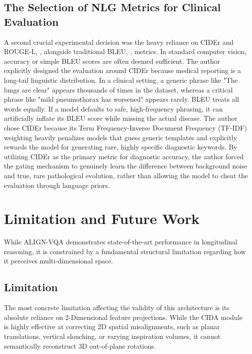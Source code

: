 \subsection{The Selection of NLG Metrics for Clinical Evaluation}
A second crucial experimental decision was the heavy reliance on CIDEr and ROUGE-L, \cite{rouge}, alongside traditional BLEU, \cite{bleu}, metrics. In standard computer vision, accuracy or simple BLEU scores are often deemed sufficient. The author explicitly designed the evaluation around CIDEr because medical reporting is a long-tail linguistic distribution. In a clinical setting, a generic phrase like "The lungs are clear" appears thousands of times in the dataset, whereas a critical phrase like "mild pneumothorax has worsened" appears rarely. BLEU treats all words equally. If a model defaults to safe, high-frequency phrasing, it can artificially inflate its BLEU score while missing the actual disease. The author chose CIDEr because its Term Frequency-Inverse Document Frequency (TF-IDF) weighting heavily penalizes models that guess generic templates and explicitly rewards the model for generating rare, highly specific diagnostic keywords. By utilizing CIDEr as the primary metric for diagnostic accuracy, the author forced the gating mechanism to genuinely learn the difference between background noise and true, rare pathological evolution, rather than allowing the model to cheat the evaluation through language priors.

\section{Limitation and Future Work}
While ALIGN-VQA demonstrates state-of-the-art performance in longitudinal reasoning, it is constrained by a fundamental structural limitation regarding how it perceives multi-dimensional space.

\subsection{Limitation}
The most concrete limitation affecting the validity of this architecture is its absolute reliance on 2-Dimensional feature projections. While the CIDA module is highly effective at correcting 2D spatial misalignments, such as planar translations, vertical slouching, or varying inspiration volumes, it cannot semantically reconstruct 3D out-of-plane rotations. 

